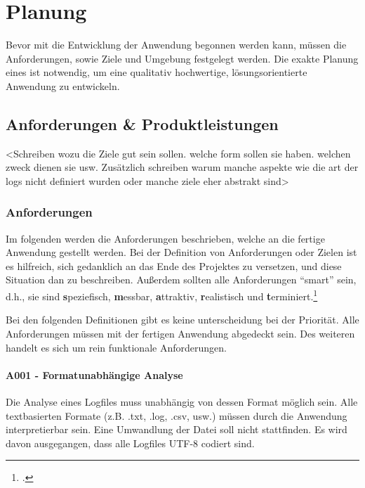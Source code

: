
\chapter{Planung}\label{cha:Planung}
Bevor mit die Entwicklung der Anwendung begonnen werden kann, müssen die Anforderungen, sowie Ziele und Umgebung festgelegt werden. Die exakte Planung eines ist notwendig, um eine qualitativ hochwertige, lösungsorientierte Anwendung zu entwickeln.


\section{Anforderungen \& Produktleistungen}
<Schreiben wozu die Ziele gut sein sollen. welche form sollen sie haben. welchen zweck dienen sie usw. Zusätzlich schreiben warum manche aspekte wie die art der logs nicht definiert wurden oder manche ziele eher abstrakt sind>

\subsection{Anforderungen}
Im folgenden werden die Anforderungen beschrieben, welche an die fertige Anwendung gestellt werden. Bei der Definition von Anforderungen oder Zielen ist es hilfreich, sich gedanklich an das Ende des Projektes zu versetzen, und diese Situation dan zu beschreiben. Außerdem sollten alle Anforderungen "`smart"' sein, d.h., sie sind \textbf{s}peziefisch, \textbf{m}essbar, \textbf{a}ttraktiv, \textbf{r}ealistisch und \textbf{t}erminiert.\footcite[Vgl.][S. 48]{Bauer.2014}

Bei den folgenden Definitionen gibt es keine unterscheidung bei der Priorität. Alle Anforderungen müssen mit der fertigen Anwendung abgedeckt sein. Des weiteren handelt es sich um rein funktionale Anforderungen. 

\subsubsection{A001 - Formatunabhängige Analyse}\label{subsubsec:A001}
Die Analyse eines Logfiles muss unabhängig von dessen Format möglich sein. Alle textbasierten Formate (z.B. .txt, .log, .csv, usw.) müssen durch die Anwendung interpretierbar sein. Eine Umwandlung der Datei soll nicht stattfinden. Es wird davon ausgegangen, dass alle Logfiles UTF-8 codiert sind.


